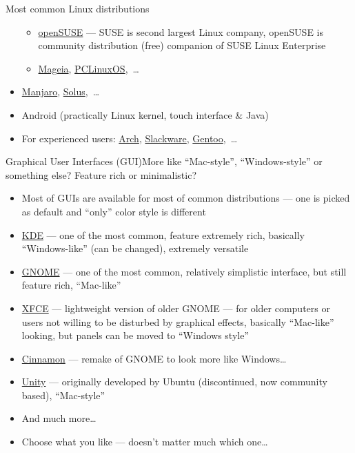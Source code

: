 \documentclass[compress, xelatex, 11pt, xcolor=svgnames, aspectratio=169,
	hyperref={
		bookmarks=true,
		unicode=true,
		colorlinks=true,
		pdftitle={Linux, command line and MetaCentrum},
		plainpages=false,
		pdfauthor={Vojtech Zeisek},
		pdfsubject={Course about use of Linux command line, writing shell scripts and using MetaCentrum of CESNET},
		pdfcreator={XeLaTeX},
		pdfkeywords={Linux, GNU, BASH, shell, command line, MetaCentrum},
		linkcolor=DarkRed, %
		anchorcolor=DarkBlue, %
		citecolor=Indigo, %
		filecolor=NavyBlue, %
		menucolor=DarkMagenta, %
		urlcolor=DarkBlue, %
		},
	url={hyphens, lowtilde} %
	]{beamer}
\begin{document}
\begin{frame}{Most common Linux distributions}
\begin{itemize}
\begin{itemize}
			\item \href{https://www.opensuse.org/}{openSUSE} --- SUSE is second largest Linux company, openSUSE is community distribution (free) companion of SUSE Linux Enterprise
			\item \href{https://www.mageia.org/}{Mageia}, \href{https://www.pclinuxos.com/}{PCLinuxOS},~\ldots
		\end{itemize}
		\item \href{https://manjaro.org/}{Manjaro}, \href{https://getsol.us/}{Solus},~\ldots
		\item Android (practically Linux kernel, touch interface \& Java)
		\item For experienced users: \href{https://archlinux.org/}{Arch}, \href{http://www.slackware.com/}{Slackware}, \href{https://www.gentoo.org/}{Gentoo},~\ldots
	\end{itemize}
\end{frame}

\begin{frame}{Graphical User Interfaces (GUI)}{More like \enquote{Mac-style}, \enquote{Windows-style} or something else? Feature rich or minimalistic?}
	\begin{itemize}
		\item Most of GUIs are available for most of common distributions --- one is picked as default and \enquote{only} color style is different
		\item \href{https://kde.org/}{KDE} --- one of the most common, feature extremely rich, basically \enquote{Windows-like} (can be changed), extremely versatile
		\item \href{https://www.gnome.org/}{GNOME} --- one of the most common, relatively simplistic interface, but still feature rich, \enquote{Mac-like}
		\item \href{https://xfce.org/}{XFCE} --- lightweight version of older GNOME --- for older computers or users not willing to be disturbed by graphical effects, basically \enquote{Mac-like} looking, but panels can be moved to \enquote{Windows style}
		\item \href{https://cinnamon-spices.linuxmint.com/}{Cinnamon} --- remake of GNOME to look more like Windows\ldots
		\item \href{https://code.launchpad.net/unity}{Unity} --- originally developed by Ubuntu (discontinued, now community based), \enquote{Mac-style}
		\item And much more\ldots
		\item Choose what you like --- doesn't matter much which one\ldots
	\end{itemize}
\end{frame}
\end{document}
